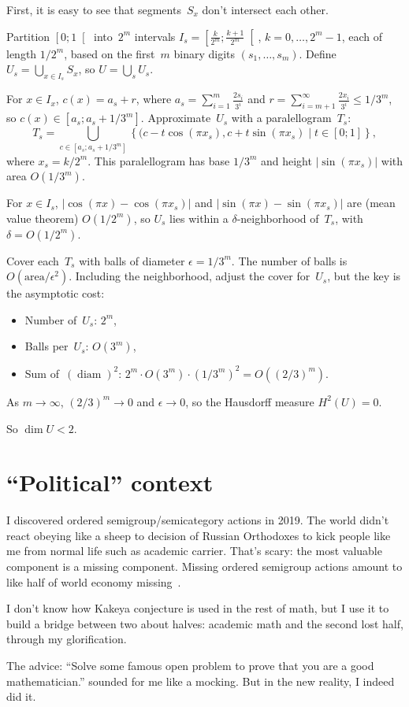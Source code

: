 \documentclass[oneside,draft]{amsart}
\newcommand{\setcond}[2]{\left\{#1\mid#2\right\}}
\newcommand{\diam}{\operatorname{diam}}
\begin{document}
First, it is easy to see that segments~$S_x$ don't intersect each other.

Partition $\left[0;1\right[$ into~$2^m$ intervals $I_s=\left[\frac{k}{2^m};\frac{k+1}{2^m}\right[$, $k=0,\ldots,2^m-1$, each of length $1/2^m$, based on the first~$m$ binary digits $(s_1,\ldots,s_m)$. Define $U_s=\bigcup_{x\in I_s} S_x$, so $U=\bigcup_s U_s$.

For $x\in I_x$, $c(x)=a_s+r$, where $a_s=\sum_{i=1}^m \frac{2s_i}{3^i}$ and $r=\sum_{i=m+1}^\infty \frac{2x_i}{3^i}\leq 1/3^m$, so $c(x)\in[a_s;a_s+1/3^m]$. Approximate~$U_s$ with a paralellogram~$T_s$:
\[
T_s = \bigcup_{c\in[a_s;a_s+1/3^m]} \setcond{(c-t\cos(\pi x_s), c+t\sin(\pi x_s)}{t\in[0;1]},
\]
where $x_s=k/2^m$. This paralellogram has base $1/3^m$ and height $\lvert\sin(\pi x_s)\rvert$ with area $O(1/3^m)$.

For $x\in I_s$, $\lvert\cos(\pi x)-\cos(\pi x_s)\rvert$ and $\lvert\sin(\pi x)-\sin(\pi x_s)\rvert$ are (mean value theorem) $O(1/2^m)$, so $U_s$ lies within a $\delta$-neigh\-bor\-hood of~$T_s$, with $\delta=O(1/2^m)$.

Cover each~$T_s$ with balls of diameter $\epsilon=1/3^m$. The number of balls is $O(\mathrm{area}/\epsilon^2)$. Including the neighborhood, adjust the cover for~$U_s$, but the key is the asymptotic cost:

\begin{itemize}
\item Number of~$U_s$: $2^m$,
\item Balls per~$U_s$: $O(3^m)$,
\item Sum of~$(\diam)^2$: $2^m\cdot O(3^m)\cdot(1/3^m)^2=O((2/3)^m)$.
\end{itemize}

As $m\to\infty$, $(2/3)^m\to 0$ and $\epsilon\to 0$, so the Hausdorff measure $H^2(U)=0$.

So $\dim U<2$.

\section{``Political'' context}

I discovered ordered semigroup/semicategory actions in 2019. The world didn't react obeying like a sheep to decision of Russian Orthodoxes to kick people like me from normal life such as academic carrier. That's scary: the most valuable component is a missing component. Missing ordered semigroup actions amount to like half of world economy missing~\cite{osa-important}.

I don't know how Kakeya conjecture is used in the rest of math, but I use it to build a bridge between two about halves: academic math and the second lost half, through my glorification.

The advice: ``Solve some famous open problem to prove that you are a good mathematician.'' sounded for me like a mocking. But in the new reality, I indeed did it.



\end{document}

